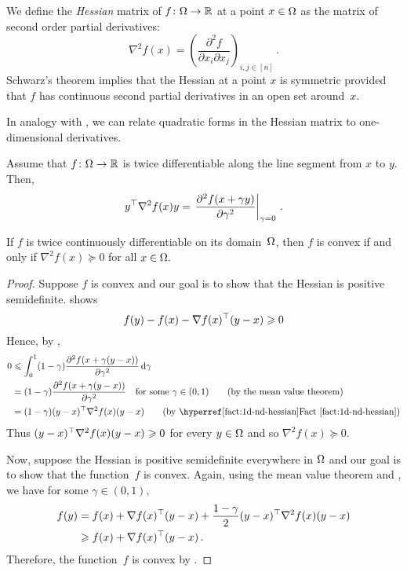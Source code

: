 We define the \emph{Hessian} matrix of $f\colon\Omega\to\mathbb{R}$ at a point $x\in\Omega$ as the matrix of second order partial derivatives:
\[
\nabla^2 f(x) = \left( \frac{\partial^2 f}{\partial x_i\partial x_j} \right)_{i,j\in[n]}\,.
\]
Schwarz's theorem implies that the Hessian at a point $x$ is symmetric provided
that $f$ has continuous second partial derivatives in an open set around~$x.$

In analogy with , we can relate quadratic forms in the Hessian matrix to one-dimensional derivatives.
\begin{fact}
Assume that $f\colon\Omega\to\mathbb{R}$ is twice differentiable along the line segment from $x$ to $y.$ Then,
\[
y^\top \nabla^2f(x)y 
= \left.\frac{\partial^2f(x+\gamma y)}{\partial\gamma^2}\right|_{\gamma=0}\,.
\]
\end{fact}

\begin{proposition}
If $f$ is twice continuously differentiable on its domain~$\Omega$, then $f$ is convex if and only if $\nabla^2 f(x)\succeq 0$ for all $x\in\Omega.$ 
\end{proposition}
\begin{proof}
Suppose $f$ is convex and our goal is to show that the Hessian is positive semidefinite.  shows
\[
f(y) - f(x) -\nabla f(x)^\top (y-x) \geqslant 0
\]
Hence, by ,
\begin{align*}
0&\le  \int_0^1 (1-\gamma)\frac{\partial^2 f(x+\gamma(y-x))}{\partial\gamma^2}\rd\gamma\\
&=  (1-\gamma)\frac{\partial^2 f(x+\gamma(y-x))}{\partial\gamma^2}\quad\text{for some $\gamma\in(0,1)$} \tag{by the mean value theorem}\\
&= (1-\gamma)(y-x)^\trans \nabla^2 f(x)(y-x) \tag{by \factref{1d-nd-hessian}}
\end{align*}
Thus $(y-x)^\top \nabla^2 f(x)(y-x)\geqslant0$ for every $y\in\Omega$ and so $\nabla^2 f(x)\succeq 0.$

Now, suppose the Hessian is positive semidefinite everywhere in $\Omega$ and our goal is to show that  the function~$f$ is convex. Again, using the mean value theorem and , we have
for some $\gamma\in(0,1),$
\begin{align*}
f(y) &= f(x) + \nabla f(x)^\top (y-x) + \frac{1-\gamma}2(y-x)^\top \nabla^2 f(x)(y-x)\\
&\geqslant  f(x) + \nabla f(x)^\top (y-x)\,.
\end{align*}
Therefore, the function~$f$ is convex by .
\end{proof}

